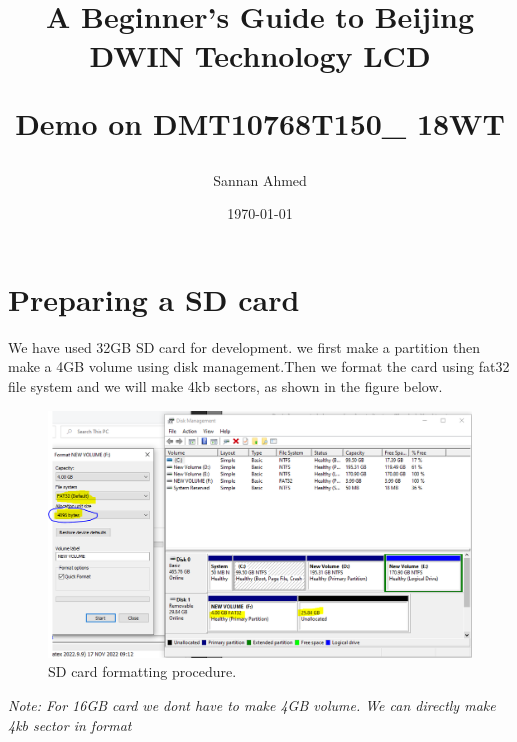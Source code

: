 \documentclass[12pt, A4]{article} %
\title{A Beginner's Guide to  Beijing DWIN Technology LCD 

Demo on DMT10768T150\_ 18WT}
\author{Sannan Ahmed}
\date{\today} %
\begin{document}

\begin{titlepage}
\maketitle
\thispagestyle{empty} %
\end{titlepage}



\section{Preparing a SD card}

We have used 32GB SD card for development. we first make a partition then make a 4GB volume using disk management.Then we format the card using fat32 file system and we will make 4kb sectors, as shown in the figure below.\\


\begin{figure}[!htb] %
	\centering
	\includegraphics[width=15cm]{sdCard} 
	\caption{SD card formatting procedure.\\}
\end{figure}


\emph{\textit{Note: For 16GB card we dont have to make 4GB volume. We can directly make 4kb sector in format}}

\newpage
\end{document}
